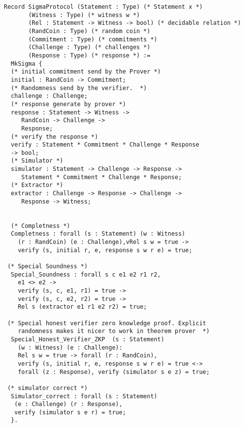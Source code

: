 \begin{verbatim}
Record SigmaProtocol (Statement : Type) (* Statement x *)
       (Witness : Type) (* witness w *)
       (Rel : Statement -> Witness -> bool) (* decidable relation *)
       (RandCoin : Type) (* random coin *) 
       (Commitment : Type) (* commitments *)
       (Challenge : Type) (* challenges *) 
       (Response : Type) (* response *) :=
  MkSigma {
  (* initial commitment send by the Prover *)
  initial : RandCoin -> Commitment;
  (* Randomness send by the verifier.  *) 
  challenge : Challenge;
  (* response generate by prover *)
  response : Statement -> Witness ->
     RandCoin -> Challenge ->
     Response;
  (* verify the response *)
  verify : Statement * Commitment * Challenge * Response
  -> bool;
  (* Simulator *)
  simulator : Statement -> Challenge -> Response ->
     Statement * Commitment * Challenge * Response;
  (* Extractor *)
  extractor : Challenge -> Response -> Challenge -> 
     Response -> Witness;
  

  (* Completness *)
  Completness : forall (s : Statement) (w : Witness)
    (r : RandCoin) (e : Challenge),vRel s w = true -> 
    verify (s, initial r, e, response s w r e) = true;

 (* Special Soundness *)
  Special_Soundness : forall s c e1 e2 r1 r2,
    e1 <> e2 ->
    verify (s, c, e1, r1) = true ->
    verify (s, c, e2, r2) = true ->
    Rel s (extractor e1 r1 e2 r2) = true;
  
 (* Special honest verifier zero knowledge proof. Explicit 
    randomness makes it nicer to work in theorem prover  *)
  Special_Honest_Verifier_ZKP  (s : Statement) 
    (w : Witness) (e : Challenge): 
    Rel s w = true -> forall (r : RandCoin), 
    verify (s, initial r, e, response s w r e) = true <->
    forall (z : Response), verify (simulator s e z) = true;
  
 (* simulator correct *)
  Simulator_correct : forall (s : Statement) 
   (e : Challenge) (r : Response),
   verify (simulator s e r) = true;
  }.
\end{verbatim}


